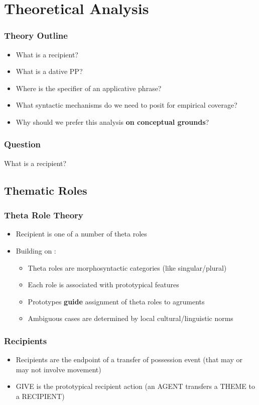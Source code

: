 \documentclass{beamer}
\begin{document}
\section{Theoretical Analysis}
\begin{frame}
	\frametitle{Theory Outline}
	\begin{itemize}
		\item What is a recipient?
		\item What is a dative PP?
		\item Where is the specifier of an applicative phrase?
		\item What syntactic mechanisms do we need to posit for empirical coverage?
		\item Why should we prefer this analysis \textbf{on conceptual grounds}?
	\end{itemize}
\end{frame}
\begin{frame}
	\frametitle{Question}
	\vfill
	\Large
		What is a recipient?
	\vfill
\end{frame}
\subsection{Thematic Roles}
\begin{frame}
	\frametitle{Theta Role Theory}
	\begin{itemize}
		\item Recipient is one of a number of theta roles
		\item Building on \cite{Dowty.1991}:
			\begin{itemize}
				\item Theta roles are morphosyntactic categories (like singular/plural)
				\item Each role is associated with prototypical features
				\item Prototypes \textbf{guide} assignment of theta roles to agruments
				\item Ambiguous cases are determined by local cultural/linguistic norms
			\end{itemize}
	\end{itemize}
\end{frame}

\begin{frame}
	\frametitle{Recipients}
	\begin{itemize}
		\item Recipients are the endpoint of a transfer of possession event (that may or may not involve movement)
		\item GIVE is the prototypical recipient action (an AGENT transfers a THEME to a RECIPIENT)
	\end{itemize}
\end{frame}
\end{document}
